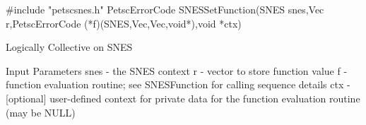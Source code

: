 #include "petscsnes.h"  
PetscErrorCode  SNESSetFunction(SNES snes,Vec r,PetscErrorCode (*f)(SNES,Vec,Vec,void*),void *ctx)

Logically Collective on SNES

Input Parameters
snes - the SNES context
r    - vector to store function value
f    - function evaluation routine; see SNESFunction for calling sequence details
ctx  - [optional] user-defined context for private data for the function evaluation routine
       (may be NULL) 
